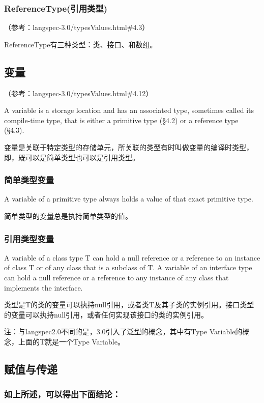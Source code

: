 \documentclass[10pt,b5paper]{article}
\begin{document}
\subsubsection{ReferenceType(引用类型)}
\label{sec-1-6-2}
（参考：langspec-3.0/typesValues.html\#4.3）

ReferenceType有三种类型：类、接口、和数组。
\subsection{变量}
\label{sec-1-7}
（参考：langspec-3.0/typesValues.html\#4.12）

A variable is a storage location and has an associated type, sometimes called its compile-time type, that is either a primitive type (§4.2) or a reference type (§4.3).

变量是关联于特定类型的存储单元，所关联的类型有时叫做变量的编译时类型，即，既可以是简单类型也可以是引用类型。

\subsubsection{简单类型变量}
\label{sec-1-7-1}
A variable of a primitive type always holds a value of that exact primitive type.

简单类型的变量总是执持简单类型的值。
\subsubsection{引用类型变量}
\label{sec-1-7-2}
A variable of a class type T can hold a null reference or a reference to an instance of class T or of any class that is a subclass of T. A variable of an interface type can hold a null reference or a reference to any instance of any class that implements the interface.

类型是T的类的变量可以执持null引用，或者类T及其子类的实例引用。接口类型的变量可以执持null引用，或者任何实现该接口的类的实例引用。

注：与langspec2.0不同的是，3.0引入了泛型的概念，其中有Type Variable的概念，上面的T就是一个Type Variable。
\subsection{赋值与传递}
\label{sec-1-8}
\subsubsection{如上所述，可以得出下面结论：}
\label{sec-1-8-1}
\end{document}
